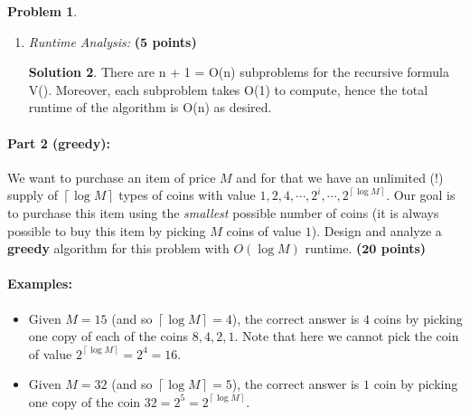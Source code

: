 \documentclass{article}
\theoremstyle{definition}
\newtheorem{problem}{Problem}
\newtheorem*{solution*}{Solution}
\newenvironment{solution}{\begin{solution*}}{{} \end{solution*}}
\newcommand{\grade}[1]{\hfill{\textbf{($\mathbf{#1}$ points)}}}
\newcommand{\ceil}[1]{{\left\lceil{#1}\right\rceil}}
\begin{document}
\begin{problem}
\begin{enumerate}[label=(\alph*)]
	\bigskip	
	\begin{solution}
	
	We design a memoization algorithm for the problem. \\
	Let T [1 : n] be an n dimensional array originally filled with ‘undefined’. We write the following recursive function:
	memV(i) :
	(1) If i = 0, return 0;
	(2) If i = 1, return vi;
	(3) If T [i] = |undefined’ return T [i].
	(4) Else let $T[i] = minBias$. 
	(5) Return T[i]. \\
	The answer to the problem can then be computed. \\
	
	\end{solution}
	
	\item \emph{Runtime Analysis:} \grade{5}
	
	\bigskip	
	\begin{solution}
	
	There are n + 1 = O(n) subproblems for the recursive formula V(). Moreover, each subproblem takes O(1) to compute, hence the total runtime of the algorithm is O(n) as desired.
	
	\end{solution}
	
	
\end{enumerate}


\newpage
\paragraph{Part 2 (greedy):} 
	We want to purchase an item of price $M$ and for that we have an unlimited (!) supply of $\ceil{\log{M}}$ types of coins with value $1,2,4,\cdots,2^{i},\cdots,2^{\ceil{\log{M}}}$. 
	Our goal is to purchase this item using the \emph{smallest} possible number of coins (it is always possible to buy this item by picking $M$ coins of value $1$).
	Design and analyze a \textbf{greedy} algorithm for this problem with $O(\log{M})$ runtime. \grade{20}

	\paragraph{Examples:} 
	\begin{itemize}
		\item Given $M=15$ (and so $\ceil{\log{M}} = 4$), the correct answer is $4$ coins by picking one copy of each of the coins $8,4,2,1$. Note that here we cannot pick the coin of value $2^{\ceil{\log{M}}} = 2^{4} = 16$.
		\item Given $M=32$ (and so $\ceil{\log{M}} = 5$), the correct answer is $1$ coin by picking one copy of the coin $32 = 2^{5} = 2^{\ceil{\log{M}}}$. 


\end{itemize}
\end{problem}
\end{document}
